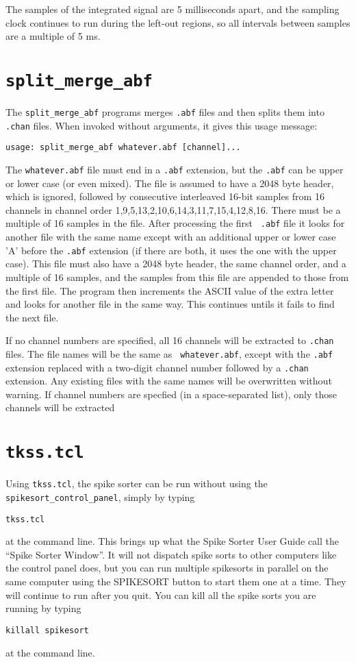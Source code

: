 \documentclass{article}
\begin{document}
The samples of the integrated signal are 5 milliseconds apart, and the
sampling clock continues to run during the left-out regions, so all
intervals between samples are a multiple of 5 ms.

\section{\tt split\_merge\_abf}
The {\tt split\_merge\_abf} programs merges {\tt .abf} files and then
splits them into {\tt .chan} files.  When invoked without arguments,
it gives this usage message:
\begin{verbatim}
usage: split_merge_abf whatever.abf [channel]...
\end{verbatim}
The {\tt whatever.abf} file must end in a {\tt .abf} extension, but
the {\tt .abf} can be upper or lower case (or even mixed).  The file
is assumed to have a 2048 byte header, which is ignored, followed by
consecutive interleaved 16-bit samples from 16 channels in channel
order 1,9,5,13,2,10,6,14,3,11,7,15,4,12,8,16.  There must be a
multiple of 16 samples in the file.  After processing the first {\tt
  .abf} file it looks for another file with the same name except with
an additional upper or lower case 'A' before the {\tt .abf} extension
(if there are both, it uses the one with the upper case).  This file
must also have a 2048 byte header, the same channel order, and a
multiple of 16 samples, and the samples from this file are appended to
those from the first file.  The program then increments the ASCII
value of the extra letter and looks for another file in the same way.
This continues untils it fails to find the next file.

If no channel numbers are specified, all 16 channels will be extracted
to {\tt .chan} files.  The file names will be the same as {\tt
  whatever.abf}, except with the {\tt .abf} extension replaced with a
two-digit channel number followed by a {\tt .chan} extension.  Any
existing files with the same names will be overwritten without
warning.  If channel numbers are specfied (in a space-separated list),
only those channels will be extracted

\section{\tt tkss.tcl}
Using {\tt tkss.tcl}, the spike sorter can be run without using the
{\tt spikesort\_control\_panel}, simply by typing
\begin{verbatim}
tkss.tcl
\end{verbatim}
at the command line.  This brings up what the Spike Sorter User Guide
call the ``Spike Sorter Window''.  It will not dispatch spike sorts to
other computers like the control panel does, but you can run multiple
spikesorts in parallel on the same computer using the SPIKESORT button
to start them one at a time.  They will continue to run after you
quit.  You can kill all the spike sorts you are running by typing
\begin{verbatim}
killall spikesort
\end{verbatim}
at the command line.
\end{document}
